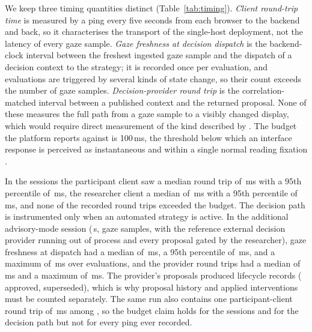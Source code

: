 We keep three timing quantities distinct (Table~\ref{tab:timing}).
\emph{Client round-trip time} is measured by a ping every five seconds from each browser to the backend and back, so it characterises the transport of the single-host deployment, not the latency of every gaze sample.
\emph{Gaze freshness at decision dispatch} is the backend-clock interval between the freshest ingested gaze sample and the dispatch of a decision context to the strategy; it is recorded once per evaluation, and evaluations are triggered by several kinds of state change, so their count exceeds the number of gaze samples.
\emph{Decision-provider round trip} is the correlation-matched interval between a published context and the returned proposal.
None of these measures the full path from a gaze sample to a visibly changed display, which would require direct measurement of the kind described by \citet{saunders2014latency}.
The budget the platform reports against is 100\,ms, the threshold below which an interface response is perceived as instantaneous \cite{miller1968response, nielsen1993responsetime} and within a single normal reading fixation \cite{rayner1998eyemovements}.

In the \sessionsN{} sessions the participant client saw a median round trip of \rttParticipantMedian{}\,ms with a 95th percentile of \rttParticipantPninefive{}\,ms, the researcher client a median of \rttResearcherMedian{}\,ms with a 95th percentile of \rttResearcherPninefive{}\,ms, and none of the \rttCohortN{} recorded round trips exceeded the budget.
The decision path is instrumented only when an automated strategy is active.
In the additional advisory-mode session (\advDurationS{}\,s, \advGazeSamples{} gaze samples, with the reference external decision provider running out of process and every proposal gated by the researcher), gaze freshness at dispatch had a median of \advFreshnessMedian{}\,ms, a 95th percentile of \advFreshnessPninefive{}\,ms, and a maximum of \advFreshnessMax{}\,ms over \advFreshnessN{} evaluations, and the \advProviderN{} provider round trips had a median of \advProviderMedian{}\,ms and a maximum of \advProviderMax{}\,ms.
The provider's \advUniqueProposals{} proposals produced \advProposalRecords{} lifecycle records (\advProposalsApproved{} approved, \advProposalsSuperseded{} superseded), which is why proposal history and applied interventions must be counted separately.
The same run also contains one participant-client round trip of \advParticipantMax{}\,ms among \advParticipantN{}, so the budget claim holds for the \sessionsN{} sessions and for the decision path but not for every ping ever recorded.

